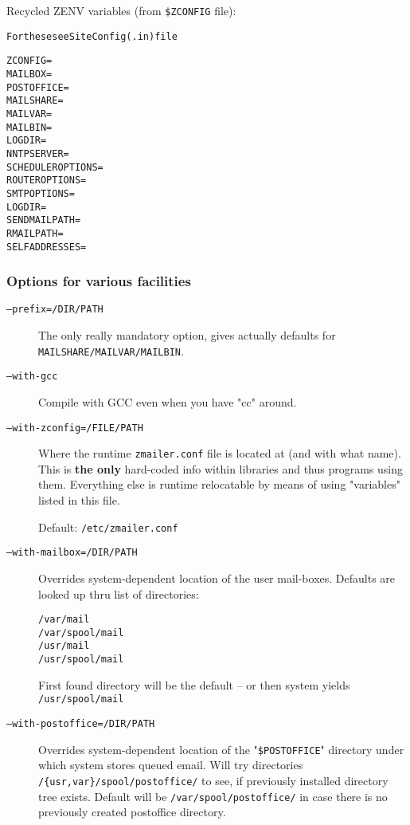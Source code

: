 Recycled ZENV variables (from {\tt \$ZCONFIG} file):
\begin{alltt}\medskip
  For these see  SiteConfig(.in)  file

  ZCONFIG=
  MAILBOX=
  POSTOFFICE=
  MAILSHARE=
  MAILVAR=
  MAILBIN=
  LOGDIR=
  NNTPSERVER=
  SCHEDULEROPTIONS=
  ROUTEROPTIONS=
  SMTPOPTIONS=
  LOGDIR=
  SENDMAILPATH=
  RMAILPATH=
  SELFADDRESSES=
\end{alltt}

\subsubsection{Options for various facilities}

\begin{description}
\item[\tt --prefix=/DIR/PATH] \mbox{}

The only really mandatory option, gives actually
defaults for \verb:MAILSHARE/MAILVAR/MAILBIN:.

\item[\tt --with-gcc] \mbox{}

Compile with GCC even when you have "cc" around.

\item[\tt --with-zconfig=/FILE/PATH] \mbox{}

Where the runtime   {\tt zmailer.conf}   file is located
at (and with what name).  This is {\bf the only} hard-coded
info within libraries and thus programs using them.
Everything else is runtime relocatable by means of using
"variables" listed in this file.

Default: {\tt /etc/zmailer.conf}

\item[\tt --with-mailbox=/DIR/PATH] \mbox{}

Overrides system-dependent location of the user mail-boxes.
Defaults are looked up thru list of directories:
\begin{alltt}
 /var/mail
 /var/spool/mail
 /usr/mail
 /usr/spool/mail
\end{alltt}
First found directory will be the default -- or then
system yields  {\tt /usr/spool/mail}

\item[\tt --with-postoffice=/DIR/PATH] \mbox{}

Overrides system-dependent location of the "{\tt \$POSTOFFICE}"
directory under which system stores queued email.
Will try directories \verb:/{usr,var}/spool/postoffice/: to
see, if previously installed directory tree exists.
Default will be  \verb:/var/spool/postoffice/:
in case there is no previously created postoffice directory.


\end{description}
